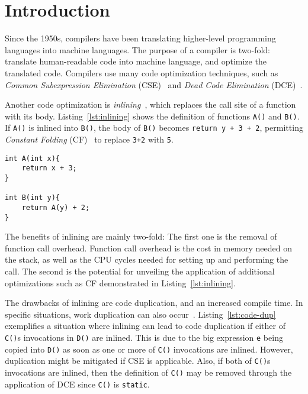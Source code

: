 
\section{Introduction}
\label{introduction}

Since the 1950s, compilers have been translating higher-level programming
languages into machine languages. The purpose of a compiler is two-fold:
translate human-readable code into machine language, and optimize the translated
code. Compilers use many code optimization techniques, such as \textit{Common
Subexpression Elimination} (CSE)~\cite[Ch. 8.5]{DragonBook} and
\textit{Dead Code Elimination} (DCE)~\cite[Ch. 8.5]{DragonBook}.

Another code optimization is \textit{inlining}~\cite[Ch. 12.1]{DragonBook},
which replaces the call site of a function with its body.
Listing~\ref{lst:inlining} shows the definition of functions \lstinline!A()! and
\lstinline!B()!. If \lstinline!A()! is inlined into \lstinline!B()!, the body of
\lstinline!B()! becomes \lstinline!return y + 3 + 2!, permitting
\textit{Constant Folding} (CF)~\cite[Ch. 8.5]{DragonBook} to replace
\lstinline!3+2! with \lstinline!5!.

\begin{centering}
	\noindent\begin{minipage}{\textwidth}
		\begin{CenteredBox}
		\begin{lstlisting}[style=global_customcpp]
int A(int x){
	return x + 3;
}

int B(int y){
	return A(y) + 2;
}
		\end{lstlisting}
		\end{CenteredBox}
	\end{minipage}
	\label{lst:inlining}
\end{centering}

The benefits of inlining are mainly two-fold: The first one is the removal of
function call overhead. Function call overhead is the cost in memory needed on
the stack, as well as the CPU cycles needed for setting up and performing the
call. The second is the potential for unveiling the application of additional
optimizations such as CF demonstrated in Listing~\ref{lst:inlining}.

The drawbacks of inlining are code duplication, and an increased compile time.
In specific situations, work duplication can also occur~\cite{GHCPaper}.
Listing~\ref{lst:code-dup} exemplifies a situation where inlining can lead to
code duplication if either of \lstinline!C()!s invocations in \lstinline!D()!
are inlined. This is due to the big expression \lstinline!e! being copied into
\lstinline!D()! as soon as one or more of \lstinline!C()! invocations are
inlined. However,  duplication might be mitigated if CSE is applicable. Also, if
both of \lstinline!C()!s invocations are inlined, then the definition of
\lstinline!C()! may be removed through the application of DCE since
\lstinline!C()! is \lstinline!static!.

